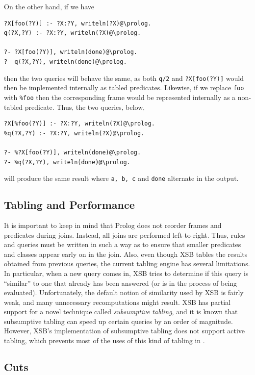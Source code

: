 \documentclass[11pt]{article}
\newcommand{\ERGO}{\mbox{\smaller{\ensuremath{\cal{E}}\smaller{{\sc{RGO}}}}}\xspace}
\newcommand{\FLSYSTEM}{\ERGO}
\begin{document}
On the other hand, if we have
\begin{verbatim}
?X[foo(?Y)] :- ?X:?Y, writeln(?X)@\prolog.
q(?X,?Y) :- ?X:?Y, writeln(?X)@\prolog.

?- ?X[foo(?Y)], writeln(done)@\prolog.
?- q(?X,?Y), writeln(done)@\prolog.
\end{verbatim}
then the two queries will behave the same, as both {\tt q/2} and
\verb|?X[foo(?Y)]| would then be implemented internally as tabled predicates.
Likewise, if we replace {\tt foo} with {\tt \%foo} then the corresponding
frame would be represented internally as a non-tabled predicate.
Thus, the two queries, below,
\begin{verbatim}
?X[%foo(?Y)] :- ?X:?Y, writeln(?X)@\prolog.
%q(?X,?Y) :- ?X:?Y, writeln(?X)@\prolog.

?- %?X[foo(?Y)], writeln(done)@\prolog.
?- %q(?X,?Y), writeln(done)@\prolog.
\end{verbatim}
will produce the same result where {\tt a, b, c} and {\tt done}
alternate in the output.

\subsection{Tabling and Performance}

It is important to keep in mind that Prolog does not reorder frames
and predicates during joins. Instead, all joins are performed
left-to-right.  Thus, rules and queries must be written in such a way as to
ensure that smaller predicates and classes appear early on in the join.
Also, even though XSB tables the results obtained from previous queries,
the current tabling engine has several limitations. In particular, when a
new query comes in, XSB tries to determine if this query is ``similar'' to
one that already has been answered (or is in the process of being
evaluated).  Unfortunately, the default notion of similarity used by XSB is
fairly weak, and many unnecessary recomputations might result. XSB has
partial support for a
novel technique called \emph{subsumptive tabling}, and
it is known that subsumptive tabling can speed up
certain queries by an order of magnitude. However, XSB's implementation
of subsumptive tabling does not support active tabling, which prevents
most of the uses of this kind of tabling in \FLSYSTEM.


\subsection{Cuts}
\end{document}
